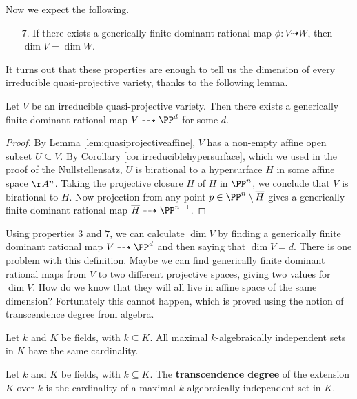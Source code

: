 Now we expect the following.
\begin{itemize}
\item[$ 7 $.] If there exists a generically finite dominant rational map $ \phi : V \dashrightarrow W $, then $ \dim V = \dim W $.
\end{itemize}
It turns out that these properties are enough to tell us the dimension of every irreducible quasi-projective variety, thanks to the following lemma.

\begin{lemma}
Let $ V $ be an irreducible quasi-projective variety. Then there exists a generically finite dominant rational map $ V \dashrightarrow \PP^d $ for some $ d $.
\end{lemma}

\begin{proof}
By Lemma \ref{lem:quasiprojectiveaffine}, $ V $ has a non-empty affine open subset $ U \subseteq V $. By Corollary \ref{cor:irreduciblehypersurface}, which we used in the proof of the Nullstellensatz, $ U $ is birational to a hypersurface $ H $ in some affine space $ \AA^n $. Taking the projective closure $ \overline{H} $ of $ H $ in $ \PP^n $, we conclude that $ V $ is birational to $ \overline{H} $. Now projection from any point $ p \in \PP^n \setminus \overline{H} $ gives a generically finite dominant rational map $ \overline{H} \dashrightarrow \PP^{n - 1} $.
\end{proof}

Using properties $ 3 $ and $ 7 $, we can calculate $ \dim V $ by finding a generically finite dominant rational map $ V \dashrightarrow \PP^d $ and then saying that $ \dim V = d $. There is one problem with this definition. Maybe we can find generically finite dominant rational maps from $ V $ to two different projective spaces, giving two values for $ \dim V $. How do we know that they will all live in affine space of the same dimension? Fortunately this cannot happen, which is proved using the notion of transcendence degree from algebra.

\begin{theorem}
\label{thm:algebraicallyindependent}
Let $ k $ and $ K $ be fields, with $ k \subseteq K $. All maximal $ k $-algebraically independent sets in $ K $ have the same cardinality.
\end{theorem}

\begin{definition*}
Let $ k $ and $ K $ be fields, with $ k \subseteq K $. The \textbf{transcendence degree} of the extension $ K $ over $ k $ is the cardinality of a maximal $ k $-algebraically independent set in $ K $.
\end{definition*}


